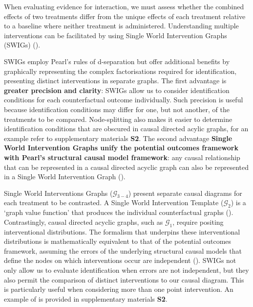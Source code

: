 \documentclass[
  single column]{article}
\begin{document}
When evaluating evidence for interaction, we must assess whether the
combined effects of two treatments differ from the unique effects of
each treatment relative to a baseline where neither treatment is
administered. Understanding multiple interventions can be facilitated by
using Single World Intervention Graphs (SWIGs)
().

SWIGs employ Pearl's rules of d-separation but offer additional benefits
by graphically representing the complex factorisations required for
identification, presenting distinct interventions in separate graphs.
The first advantage is \textbf{greater precision and clarity}: SWIGs
allow us to consider identification conditions for each counterfactual
outcome individually. Such precision is useful because identification
conditions may differ for one, but not another, of the treatments to be
compared. Node-splitting also makes it easier to determine
identification conditions that are obscured in causal directed acylic
graphs, for an example refer to supplementary materials \textbf{S2}. The
second advantage \textbf{Single World Intervention Graphs unify the
potential outcomes framework with Pearl's structural causal model
framework}: any causal relationship that can be represented in a causal
directed acyclic graph can also be represented in a Single World
Intervention Graph ().

\begin{table}

\caption{\label{tbl-swigtable}Single World Interventions Graphs
(\(\mathcal{G}_{3-4}\)) present separate causal diagrams for each
treatment to be contrasted. A Single World Intervention Template
(\(\mathcal{G}_{2}\)) is a `graph value function' that produces the
individual counterfactual graphs
().
Contrastingly, causal directed acyclic graphs, such as
\(\mathcal{G}_1\), require positing interventional distributions. The
formalism that underpins these interventional distributions is
mathematically equivalent to that of the potential outcomes framework,
assuming the errors of the underlying structural causal models that
define the nodes on which interventions occur are independent
(). SWIGs not
only allow us to evaluate identification when errors are not
independent, but they also permit the comparison of distinct
interventions to our causal diagram. This is particularly useful when
considering more than one point intervention. An example of is provided
in supplementary materials \textbf{S2}.}

\centering{

\swigtable

}

\end{table}%
\end{document}
